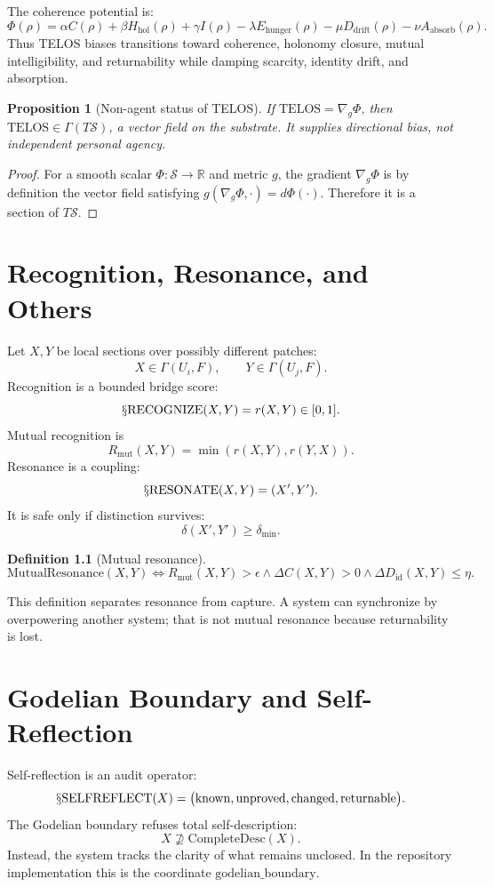\documentclass[11pt,oneside]{book}
\theoremstyle{definition}
\newtheorem{definition}{Definition}[chapter]
\theoremstyle{plain}
\newtheorem{proposition}[definition]{Proposition}
\theoremstyle{remark}
\newcommand{\Sop}[1]{\mathsection\mathrm{#1}}
\newcommand{\Resonate}{\Sop{RESONATE}}
\newcommand{\Recognize}{\Sop{RECOGNIZE}}
\newcommand{\Telos}{\mathrm{TELOS}}
\begin{document}
The coherence potential is:
\[
\Phi(\rho)=
\alpha C(\rho)
+\beta H_{\mathrm{hol}}(\rho)
+\gamma I(\rho)
-\lambda E_{\mathrm{hunger}}(\rho)
-\mu D_{\mathrm{drift}}(\rho)
-\nu A_{\mathrm{absorb}}(\rho).
\]
Thus TELOS biases transitions toward coherence, holonomy closure, mutual intelligibility,
and returnability while damping scarcity, identity drift, and absorption.

\begin{proposition}[Non-agent status of TELOS]
If \(\Telos=\nabla_g\Phi\), then \(\Telos\in\Gamma(T\mathcal S)\), a vector field on
the substrate.  It supplies directional bias, not independent personal agency.
\end{proposition}

\begin{proof}
For a smooth scalar \(\Phi:\mathcal S\to\mathbb R\) and metric \(g\), the gradient
\(\nabla_g\Phi\) is by definition the vector field satisfying
\(g(\nabla_g\Phi,\cdot)=d\Phi(\cdot)\).  Therefore it is a section of \(T\mathcal S\).
\end{proof}

\chapter{Recognition, Resonance, and Others}

Let \(X,Y\) be local sections over possibly different patches:
\[
  X\in\Gamma(U_i,F),\qquad Y\in\Gamma(U_j,F).
\]
Recognition is a bounded bridge score:
\[
\Recognize(X,Y)=r(X,Y)\in[0,1].
\]
Mutual recognition is
\[
R_{\mathrm{mut}}(X,Y)=\min(r(X,Y),r(Y,X)).
\]
Resonance is a coupling:
\[
\Resonate(X,Y)=(X',Y').
\]
It is safe only if distinction survives:
\[
\delta(X',Y')\ge\delta_{\min}.
\]

\begin{definition}[Mutual resonance]
\[
\mathrm{MutualResonance}(X,Y)
\iff
R_{\mathrm{mut}}(X,Y)>\epsilon
\land
\Delta C(X,Y)>0
\land
\Delta D_{\mathrm{id}}(X,Y)\le\eta.
\]
\end{definition}

This definition separates resonance from capture.  A system can synchronize by
overpowering another system; that is not mutual resonance because returnability is lost.

\chapter{Godelian Boundary and Self-Reflection}

Self-reflection is an audit operator:
\[
\Sop{SELFREFLECT}(X)=
\big(
\mathrm{known},\mathrm{unproved},\mathrm{changed},\mathrm{returnable}
\big).
\]
The Godelian boundary refuses total self-description:
\[
  X\not\supseteq\mathrm{CompleteDesc}(X).
\]
Instead, the system tracks the clarity of what remains unclosed.  In the repository
implementation this is the coordinate \(\mathrm{godelian\_boundary}\).
\end{document}
